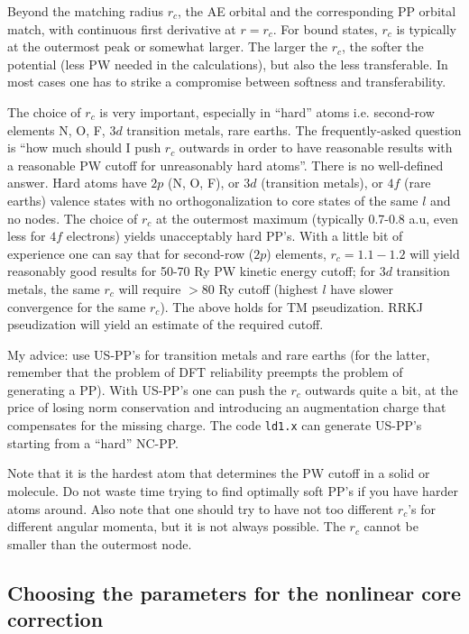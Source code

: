 Beyond the matching radius $r_c$, the AE orbital and the corresponding 
PP orbital match, with continuous first derivative at $r=r_c$. 
For bound states, $r_c$ is typically at the outermost peak or 
somewhat larger. The larger the $r_c$, the softer the potential 
(less PW needed in the calculations), but also the less transferable.
In most cases one has to strike a compromise between softness
and transferability.

The choice of $r_c$ is very important, especially in ``hard'' atoms
i.e. second-row elements N, O, F, $3d$ transition metals, rare earths.
The frequently-asked question is ``how much should I push $r_c$ outwards
in order to have reasonable results with a reasonable PW cutoff for 
unreasonably hard atoms''. 
There is no well-defined answer. Hard atoms have $2p$ (N, O, F), or
$3d$ (transition metals), or $4f$ (rare earths) valence states with 
no orthogonalization to core states of the same $l$ and no nodes.
The choice of $r_c$ at the outermost maximum (typically 0.7-0.8 a.u,
even less for $4f$ electrons) yields unacceptably hard PP's. With a 
little bit of experience one can say that for second-row ($2p$) elements,
$r_c=1.1-1.2$ will yield
reasonably good results for 50-70 Ry PW kinetic energy cutoff; for
$3d$ transition metals, the same $r_c$ will require $> 80$ Ry cutoff
(highest $l$ have slower convergence for the same $r_c$). The above
holds for TM pseudization. RRKJ pseudization will yield an
estimate of the required cutoff.

My advice: use US-PP's for transition metals and rare earths 
(for the latter, remember that the problem of DFT reliability 
preempts the problem of generating a PP). With US-PP's one
can push the $r_c$ outwards quite a bit, at the price of losing
norm conservation and introducing an augmentation charge that
compensates for the missing charge. The code {\tt ld1.x} can
generate US-PP's starting from a ``hard'' NC-PP.

Note that it is the hardest atom that determines the PW cutoff in a
solid or molecule. Do not waste time trying to find optimally soft 
PP's if you have harder atoms around. Also note that one should try 
to have not too different $r_c$'s for different angular momenta, but 
it is not always possible. The $r_c$
cannot be smaller than the outermost node.

\subsection{Choosing the parameters for the nonlinear core correction}


